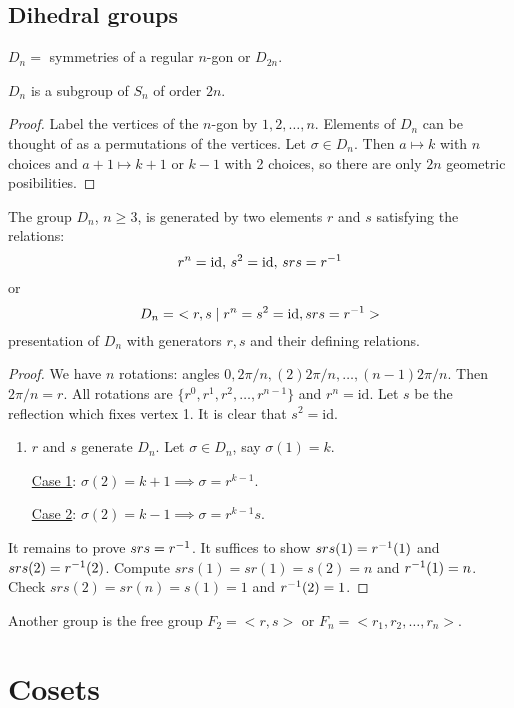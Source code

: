 \documentclass[]{article}
\begin{document}
\subsection{Dihedral groups}

$D_n =$ symmetries of a regular $n$-gon or $D_{2n}$.
\begin{theorem}
	$D_n$ is a subgroup of $S_n$ of order $2n$.
\end{theorem}
\begin{proof}
	Label the vertices of the $n$-gon by $1,2,\dots,n$. Elements of $D_n$ can be thought of as a permutations of the vertices.
	Let $\sigma\in D_n$. Then $a\mapsto k$ with $n$ choices and $a+1\mapsto k+1$ or $k-1$ with 2 choices, so there are only $2n$ geometric posibilities.
\end{proof}
\begin{theorem}
	The group $D_n$, $n\geq 3$, is generated by two elements $r$ and $s$ satisfying the relations: $$r^n = \text{id},\,s^2 = \text{id},\,srs = r^{-1}$$
	or $$ D_n =\ < r,s\mid r^n = s^2 = \text{id},srs = r^{-1}>$$ presentation of $D_n$ with generators $r,s$ and their defining relations.
\end{theorem}
\begin{proof}
	We have $n$ rotations: angles $0,2\pi/n,(2)2\pi/n,\dots,(n-1)2\pi/n$. Then $2\pi/n = r$. All rotations are $\{r^0,r^1,r^2,\dots,r^{n-1}\}$ and $r^n = \text{id}$.
	Let $s$ be the reflection which fixes vertex 1.
	It is clear that $s^2 = \text{id}$.
	\begin{enumerate}
		\item $r$ and $s$ generate $D_n$. Let $\sigma\in D_n$, say $\sigma(1) = k$.
			
			\ul{Case 1}: $\sigma(2) = k+1 \implies \sigma = r^{k-1}$.
			
			\ul{Case 2}: $\sigma(2) = k-1 \implies \sigma = r^{k-1}s$.
	\end{enumerate}
	It remains to prove $srs = r^{-1}$. It suffices to show $srs(1) = r^{-1}(1)$ and $srs(2) = r^{-1}(2)$.
	Compute $srs(1) = sr(1) = s(2) = n$ and $r^{-1}(1) = n$.
	Check $srs(2) = sr(n) = s(1) = 1$ and $r^{-1}(2) = 1$.
\end{proof}
Another group is the free group $F_2 = <r,s>$ or $F_n = < r_1,r_2,\dots,r_n>$.

\section{Cosets}
\end{document}
